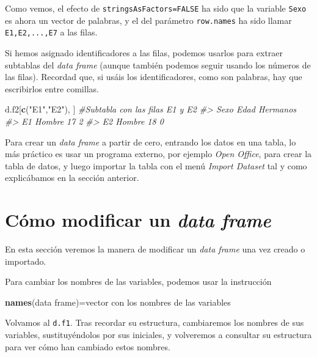 \documentclass[
]{book}
\newenvironment{Shaded}{\begin{snugshade}}{\end{snugshade}}
\newcommand{\CommentTok}[1]{\textcolor[rgb]{0.56,0.35,0.01}{\textit{#1}}}
\newcommand{\KeywordTok}[1]{\textcolor[rgb]{0.13,0.29,0.53}{\textbf{#1}}}
\newcommand{\NormalTok}[1]{#1}
\newcommand{\StringTok}[1]{\textcolor[rgb]{0.31,0.60,0.02}{#1}}
\theoremstyle{definition}
\theoremstyle{definition}
\theoremstyle{definition}
\theoremstyle{remark}
\begin{document}
Como vemos, el efecto de \texttt{stringsAsFactors=FALSE} ha sido que la variable \texttt{Sexo} es ahora un vector de palabras, y el del parámetro \texttt{row.names} ha sido llamar \texttt{E1,E2,...,E7} a las filas.

Si hemos asignado identificadores a las filas, podemos usarlos para extraer subtablas del \emph{data frame} (aunque también podemos seguir usando los números de las filas). Recordad que, si usáis los identificadores, como son palabras, hay que escribirlos entre comillas.

\begin{Shaded}
\begin{Highlighting}[]
\NormalTok{d.f2[}\KeywordTok{c}\NormalTok{(}\StringTok{"E1"}\NormalTok{,}\StringTok{"E2"}\NormalTok{), ] }\CommentTok{\#Subtabla con las filas E1 y E2}
\CommentTok{\#\textgreater{}      Sexo Edad Hermanos}
\CommentTok{\#\textgreater{} E1 Hombre   17        2}
\CommentTok{\#\textgreater{} E2 Hombre   18        0}
\end{Highlighting}
\end{Shaded}

Para crear un \emph{data frame} a partir de cero, entrando los datos en una tabla, lo más práctico es usar un programa externo, por ejemplo \emph{Open Office}, para crear la tabla de datos, y luego importar la tabla con el menú \emph{Import Dataset} tal y como explicábamos en la sección anterior.

\hypertarget{sec:moddf}{%
\section{\texorpdfstring{Cómo modificar un \emph{data frame}}{Cómo modificar un data frame}}\label{sec:moddf}}

En esta sección veremos la manera de modificar un \emph{data frame} una vez creado o importado.

Para cambiar los nombres de las variables, podemos usar la instrucción

\begin{Shaded}
\begin{Highlighting}[]
\KeywordTok{names}\NormalTok{(data frame)=vector con los nombres de las variables}
\end{Highlighting}
\end{Shaded}

Volvamos al \texttt{d.f1}. Tras recordar su estructura, cambiaremos los nombres de sus variables, sustituyéndolos por sus iniciales, y volveremos a consultar su estructura para ver cómo han cambiado estos nombres.
\end{document}
